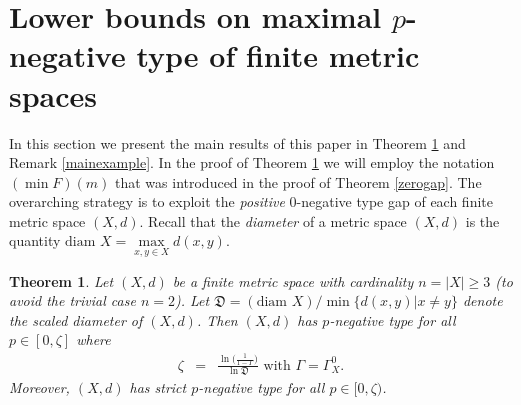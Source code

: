 \documentclass[10pt]{amsart}
\newtheorem{thm}{Theorem}[section]
\theoremstyle{definition}
\theoremstyle{remark}
\begin{document}
\section{Lower bounds on maximal $p$-negative type of finite metric spaces}
In this section we present the main results of this paper in Theorem \ref{mainthm}
and Remark \ref{mainexample}. In the proof of Theorem \ref{mainthm} we will employ
the notation $(\min F)(m)$ that was introduced in the proof of Theorem \ref{zerogap}.
The overarching strategy is to exploit the \textit{positive} $0$-negative type gap
of each finite metric space $(X,d)$. Recall that the \textit{diameter} of a metric
space $(X,d)$ is the quantity $\text{diam }X = \max\limits_{x,y \in X}d(x,y)$.

\begin{thm}\label{mainthm}
Let $(X,d)$ be a finite metric space with cardinality $n = |X| \geq 3$ (to avoid the trivial case $n=2$).
Let $\mathfrak{D} = (\text{diam } X) / \min \{d(x,y) | x \not= y\}$ denote the scaled diameter of $(X,d)$.
Then $(X,d)$ has $p$-negative type for all $p \in [0, \zeta]$ where
\begin{eqnarray*}
\zeta & = & \frac{\ln \bigl( \frac{1}{1 - \Gamma} \bigl)}{\ln \mathfrak{D}} \text{ with } \Gamma = \Gamma_{X}^{0}.
\end{eqnarray*}
Moreover, $(X,d)$ has strict $p$-negative type for all $p \in [0,\zeta)$.
\end{thm}
\end{document}
